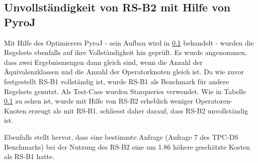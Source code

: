 \subsection{Unvollständigkeit von RS-B2 mit Hilfe von PyroJ}

Mit Hilfe des Optimierers PyroJ - sein Aufbau wird in \ref{} behandelt - wurden die Regelsets ebenfalls auf ihre Vollständigkeit hin geprüft. Es wurde angenommen, dass zwei Ergebnismengen dann gleich sind, wenn die Anzahl der Äquivalenzklassen und die Anzahl der Operatorknoten gleich ist. Da wie zuvor festgestellt RS-B1 vollständig ist, wurde RS-B1 als Benchmark für andere Regelsets genutzt. Als Test-Case wurden Starqueries verwendet. Wie in Tabelle \ref{} zu sehen ist, wurde mit Hilfe von RS-B2 erheblich weniger Operatoren-Knoten erzeugt als mit RS-B1. \cite{} schliesst daher darauf, dass RS-B2 unvollständig ist.

Ebenfalls stellt \cite{} hervor, dass eine bestimmte Anfrage (Anfrage 7 des TPC-DS Benchmarks) bei der Nutzung des RS-B2 eine um 1.86 höhere geschätzte Kosten als RS-B1 hatte.

